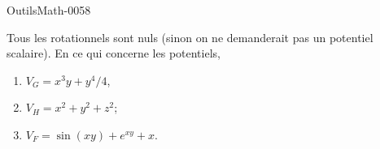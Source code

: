 
\begin{corrige}{OutilsMath-0058}

    Tous les rotationnels sont nuls (sinon on ne demanderait pas un potentiel scalaire). En ce qui concerne les potentiels,
    \begin{enumerate}
        \item
            $V_G=x^3y+y^4/4$,
        \item
            $V_H=x^2+y^2+z^2$;
        \item
            $V_F=\sin(xy)+ e^{xy}+x$.
    \end{enumerate}

\end{corrige}
